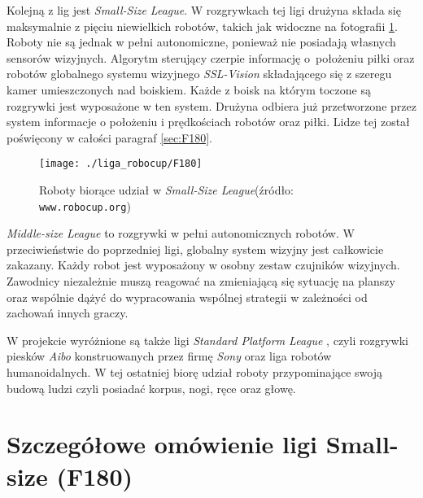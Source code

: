 	Kolejną z lig jest \emph{Small-Size League}. W rozgrywkach tej ligi drużyna składa się maksymalnie z pięciu niewielkich robotów, takich jak widoczne na fotografii \ref{fig:F180}. 
	Roboty  nie są jednak w pełni autonomiczne, ponieważ nie posiadają własnych sensorów wizyjnych. Algorytm sterujący czerpie informację o~położeniu piłki oraz robotów globalnego systemu
	wizyjnego \textit{SSL-Vision} składającego się z szeregu kamer umieszczonych nad boiskiem. Każde z boisk na którym toczone są rozgrywki jest wyposażone w ten system. Drużyna odbiera już przetworzone
	przez system informacje o położeniu i prędkościach robotów oraz piłki.
	Lidze tej został poświęcony w całości paragraf \ref{sec:F180}.	
	\begin{figure}[ht]
	\centering
	\texttt{[image: ./liga\_robocup/F180]}
	\caption{ Roboty biorące udział w \emph{Small-Size League}\newline(źródło: \texttt{www.robocup.org})} \label{fig:F180}
	\end{figure}
	
	\emph{Middle-size League} to rozgrywki w pełni autonomicznych robotów. W przeciwieństwie do poprzedniej ligi, globalny system wizyjny jest całkowicie zakazany.
	Każdy robot jest wyposażony w osobny zestaw czujników wizyjnych. Zawodnicy niezależnie muszą reagować na zmieniającą się sytuację na planszy oraz
	wspólnie dążyć do wypracowania wspólnej strategii w zależności od zachowań innych graczy.

	W projekcie wyróżnione są także ligi \emph{Standard Platform League }, czyli rozgrywki piesków \textit{Aibo} konstruowanych przez firmę \textit{Sony} oraz 
	liga robotów humanoidalnych. W tej ostatniej biorę udział roboty przypominające swoją budową ludzi czyli posiadać korpus, nogi, ręce oraz głowę.
	\section{Szczegółowe omówienie ligi Small-size (F180) \label{sec:F180}}
